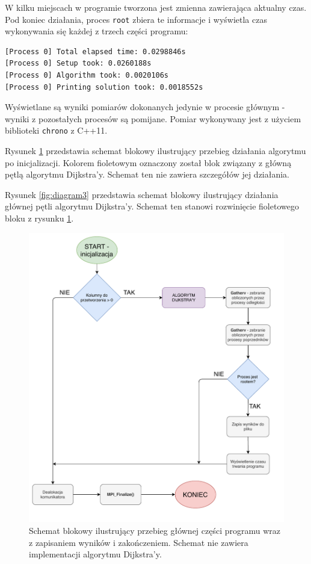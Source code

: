 \documentclass[12pt]{article}
\begin{document}
W kilku miejscach w programie tworzona jest zmienna zawierająca aktualny czas. Pod koniec działania, proces \lstinline{root} zbiera te informacje i wyświetla czas wykonywania się każdej z trzech części programu:
\begin{lstlisting}
[Process 0] Total elapsed time: 0.0298846s
[Process 0] Setup took: 0.0260188s
[Process 0] Algorithm took: 0.0020106s
[Process 0] Printing solution took: 0.0018552s
\end{lstlisting}
Wyświetlane są wyniki pomiarów dokonanych jedynie w procesie głównym - wyniki z pozostałych procesów są pomijane. Pomiar wykonywany jest z użyciem biblioteki \lstinline{chrono} z C++11.

Rysunek \ref{fig:diagram2} przedstawia schemat blokowy ilustrujący przebieg działania algorytmu po inicjalizacji. Kolorem fioletowym oznaczony został blok związany z główną pętlą algorytmu Dijkstra'y. Schemat ten nie zawiera szczegółów jej działania.

Rysunek \ref{fig:diagram3} przedstawia schemat blokowy ilustrujący działania głównej pętli algorytmu Dijkstra'y. Schemat ten stanowi rozwinięcie fioletowego bloku z rysunku \ref{fig:diagram2}.

\begin{figure}[H]
\centering
\includegraphics[width=\textwidth]{static/Diagram2.pdf}
\caption{Schemat blokowy ilustrujący przebieg głównej części programu wraz z zapisaniem wyników i zakończeniem. Schemat nie zawiera implementacji algorytmu Dijkstra'y.}
\label{fig:diagram2}
\end{figure}
\end{document}
